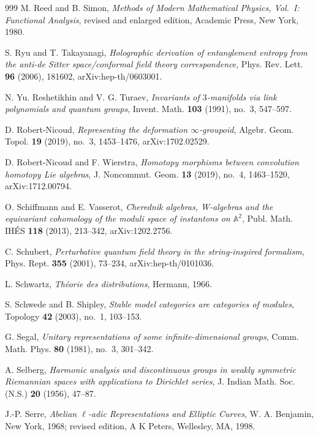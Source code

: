 \begin{thebibliography}{999}
M. Reed and B. Simon, \emph{Methods of Modern Mathematical Physics, Vol.~I: Functional Analysis}, revised and enlarged edition, Academic Press, New York, 1980.

S. Ryu and T. Takayanagi, \emph{Holographic derivation of entanglement entropy from the anti-de Sitter space/conformal field theory correspondence}, Phys. Rev. Lett. \textbf{96} (2006), 181602, arXiv:hep-th/0603001.

N. Yu. Reshetikhin and V. G. Turaev, \emph{Invariants of $3$-manifolds via link polynomials and quantum groups}, Invent. Math. \textbf{103} (1991), no.~3, 547--597.

D. Robert-Nicoud, \emph{Representing the deformation $\infty$-groupoid}, Algebr. Geom. Topol. \textbf{19} (2019), no.~3, 1453--1476, arXiv:1702.02529.

D. Robert-Nicoud and F. Wierstra, \emph{Homotopy morphisms between convolution homotopy Lie algebras}, J. Noncommut. Geom. \textbf{13} (2019), no.~4, 1463--1520, arXiv:1712.00794.

O. Schiffmann and E. Vasserot, \emph{Cherednik algebras, W-algebras and the equivariant cohomology of the moduli space of instantons on $\mathbb{A}^2$}, Publ. Math. IH\'ES \textbf{118} (2013), 213--342, arXiv:1202.2756.

C. Schubert, \emph{Perturbative quantum field theory in the string-inspired formalism}, Phys. Rept. \textbf{355} (2001), 73--234, arXiv:hep-th/0101036.

L. Schwartz, \emph{Th\'eorie des distributions}, Hermann, 1966.

S. Schwede and B. Shipley, \emph{Stable model categories are categories of modules}, Topology \textbf{42} (2003), no.~1, 103--153.

G. Segal, \emph{Unitary representations of some infinite-dimensional groups}, Comm. Math. Phys. \textbf{80} (1981), no.~3, 301--342.

A. Selberg, \emph{Harmonic analysis and discontinuous groups in weakly symmetric Riemannian spaces with applications to Dirichlet series}, J. Indian Math. Soc. (N.S.) \textbf{20} (1956), 47--87.

J.-P. Serre, \emph{Abelian $\ell$-adic Representations and Elliptic
Curves}, W. A. Benjamin, New York, 1968; revised edition, A K Peters,
Wellesley, MA, 1998.


\end{thebibliography}
